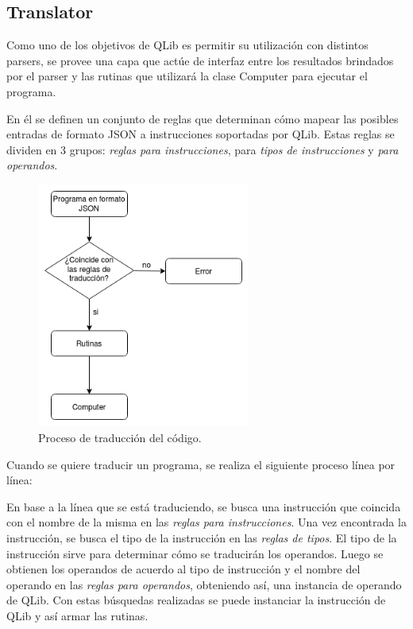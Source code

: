 \subsection{Translator}
\label{subsec:translator}
Como uno de los objetivos de QLib es permitir su utilización con distintos parsers, se provee una capa que actúe de interfaz entre los resultados 
brindados por el parser y las rutinas que utilizará la clase Computer para ejecutar el programa. 

En él se definen un conjunto de reglas que determinan cómo mapear las posibles entradas de formato JSON a instrucciones soportadas por QLib. Estas reglas 
se dividen en 3 grupos: \textit{reglas para instrucciones}, para \textit{tipos de instrucciones} y \textit{para operandos}.

\begin{figure}[H]
  \centering
  \includegraphics[width=7cm]{figuras/translator.png}
  \caption{Proceso de traducción del código.}
\end{figure}

Cuando se quiere traducir un programa, se realiza el siguiente proceso línea por línea:

En base a la línea que se está traduciendo, se busca una instrucción que coincida con el nombre de la misma en las \textit{reglas para 
instrucciones}. Una vez encontrada la instrucción, se busca el tipo de la instrucción en las \textit{reglas de tipos}. El tipo de la instrucción sirve para determinar
cómo se traducirán los operandos. Luego se obtienen los operandos de acuerdo al tipo de instrucción y el nombre del operando en las \textit{reglas para operandos}, 
obteniendo así, una instancia de operando de QLib. Con estas búsquedas realizadas se puede instanciar la instrucción de QLib y así armar las rutinas.